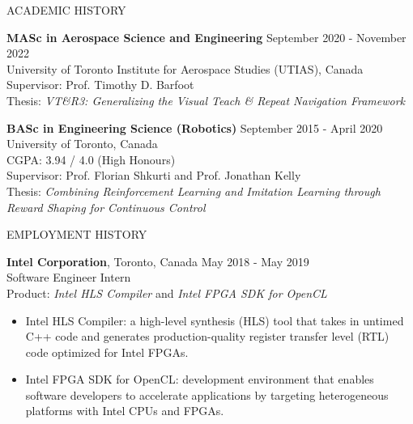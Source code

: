 \documentclass{cv}
\begin{document}

\begin{rSection}{ACADEMIC HISTORY}
  \item {\bf MASc in Aerospace Science and Engineering} \hfill {September 2020 - November 2022}\\
  University of Toronto Institute for Aerospace Studies (UTIAS), Canada\\
  Supervisor: Prof. Timothy D. Barfoot\\
  Thesis: \textit{VT\&R3: Generalizing the Visual Teach \& Repeat Navigation Framework}

  \item {\bf BASc in Engineering Science (Robotics)} \hfill {September 2015 - April 2020}\\
  University of Toronto, Canada\\
  CGPA: 3.94 / 4.0 (High Honours)\\
  Supervisor: Prof. Florian Shkurti and Prof. Jonathan Kelly\\
  Thesis: \textit{Combining Reinforcement Learning and Imitation Learning through Reward Shaping for Continuous Control}
\end{rSection}

\begin{rSection}{EMPLOYMENT HISTORY}
  \item \textbf{Intel Corporation}, Toronto, Canada  \hfill {May 2018 - May 2019}\\
  Software Engineer Intern\\
  Product: \textit{Intel HLS Compiler} and \textit{Intel FPGA SDK for OpenCL}
  \vspace{-0.5em}
  \begin{itemize}[noitemsep,topsep=0pt]
    \item Intel HLS Compiler: a high-level synthesis (HLS) tool that takes in untimed C++ code and generates production-quality register transfer level (RTL) code optimized for Intel FPGAs.
    \item Intel FPGA SDK for OpenCL: development environment that enables software developers to accelerate applications by targeting heterogeneous platforms with Intel CPUs and FPGAs.
  \end{itemize}
\end{rSection}
\end{document}
